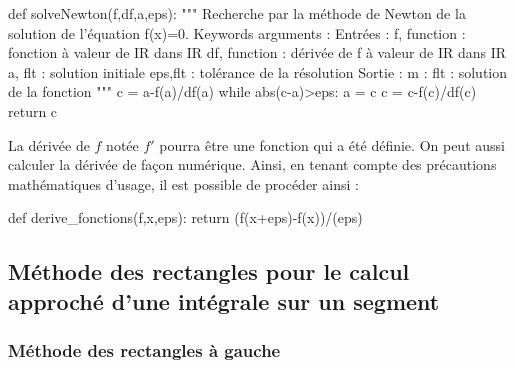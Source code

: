 \documentclass[10pt]{article}
\begin{document}
\begin{minipage}[c]{.48\linewidth}
\begin{py}
\begin{python}
def solveNewton(f,df,a,eps):
    """
    Recherche par la méthode de Newton de la solution 
    de l'équation f(x)=0.
    Keywords arguments :
    Entrées :
        f, function : fonction à valeur de IR dans IR
        df, function : dérivée de f à valeur de IR dans IR
        a, flt : solution initiale
        eps,flt : tolérance de la résolution
    Sortie : 
        m : flt : solution de la fonction    
    """
    c = a-f(a)/df(a)
    while abs(c-a)>eps:
        a = c
        c = c-f(c)/df(c)
    return c
\end{python}
\end{py}
\end{minipage} 

\begin{rem}
La dérivée de $f$ notée $f'$ pourra être une fonction qui a été définie. On peut aussi calculer la dérivée de façon numérique. Ainsi, en tenant compte des précautions mathématiques d'usage, il est possible de procéder ainsi :

\begin{py}
\begin{python}
def derive_fonctions(f,x,eps):
    return (f(x+eps)-f(x))/(eps)
\end{python}
\end{py}
\end{rem}



\subsection{Méthode des rectangles pour le calcul approché d'une intégrale sur un segment}
\subsubsection{Méthode des rectangles à gauche}
\end{document}
